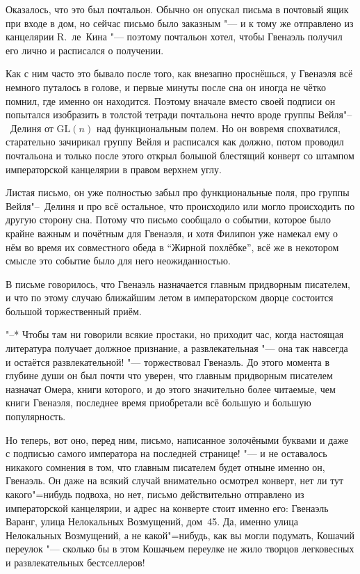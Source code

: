 Оказалось, что это был почтальон.
Обычно он опускал письма в почтовый ящик при входе в дом, но сейчас письмо было
заказным "--- и к тому же отправлено из канцелярии R.~ле~Кина "--- поэтому
почтальон хотел, чтобы Гвенаэль получил его лично и расписался о получении.

Как с ним часто это бывало после того, как внезапно проснёшься, у Гвенаэля всё
немного путалось в голове, и первые минуты после сна он иногда не чётко помнил,
где именно он находится.
Поэтому вначале вместо своей подписи он попытался изобразить в толстой тетради
почтальона нечто вроде группы Вейля"--~Делиня от $\mathrm{GL}(n)$ над функциональным
полем.
Но он вовремя спохватился, старательно зачирикал группу Вейля и расписался как
должно, потом проводил почтальона и только после этого открыл большой блестящий
конверт со штампом императорской канцелярии в правом верхнем углу.

Листая письмо, он уже полностью забыл про функциональные поля, про группы
Вейля"--~Делиня и про всё остальное, что происходило или могло происходить по
другую сторону сна.
Потому что письмо сообщало о событии, которое было крайне важным и почётным для
Гвенаэля, и хотя Филипон уже намекал ему о нём во время их совместного обеда в
\enquote{Жирной похлёбке}, всё же в некотором смысле это событие было для него
неожиданностью.

В письме говорилось, что Гвенаэль назначается главным придворным писателем, и
что по этому случаю ближайшим летом в императорском дворце состоится большой
торжественный приём.

"--* Чтобы там ни говорили всякие простаки, но приходит час, когда настоящая
литература получает должное признание, а развлекательная "--- она так навсегда
и остаётся развлекательной! "--- торжествовал Гвенаэль.
До этого момента в глубине души он был почти что уверен, что главным придворным
писателем назначат Омера, книги которого, и до этого значительно более читаемые,
чем книги Гвенаэля, последнее время приобретали всё большую и большую
популярность.

Но теперь, вот оно, перед ним, письмо, написанное золочёными буквами и даже с
подписью самого императора на последней странице! "--- и не оставалось никакого
сомнения в том, что главным писателем будет отныне именно он, Гвенаэль.
Он даже на всякий случай внимательно осмотрел конверт, нет ли тут какого"=нибудь
подвоха, но нет, письмо действительно отправлено из императорской канцелярии, и
адрес на конверте стоит именно его: Гвенаэль Варанг, улица Нелокальных
Возмущений, дом~45.
Да, именно улица Нелокальных Возмущений, а не какой"=нибудь, как вы могли
подумать, Кошачий переулок "--- сколько бы в этом Кошачьем переулке не жило
творцов легковесных и развлекательных бестселлеров!

